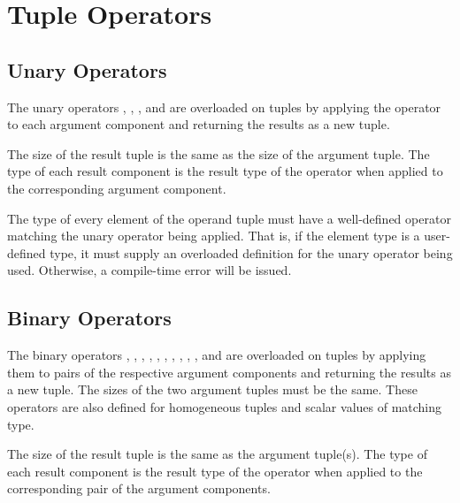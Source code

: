 \section{Tuple Operators}
\label{Tuple_Operators}

\subsection{Unary Operators}
\label{Tuple_Unary_Operators}

The unary operators \chpl{\+}, \chpl{\-}, \chpl{\~}, and \chpl{\!} are
overloaded on tuples by applying the operator to each argument component
and returning the results as a new tuple.

The size of the result tuple is the same as the size of the
argument tuple. The type of each result component is the result
type of the operator when applied to the corresponding argument component.

The type of every element of the operand tuple must have a
well-defined operator matching the unary operator being applied.  That
is, if the element type is a user-defined type, it must supply an
overloaded definition for the unary operator being used.  Otherwise, a
compile-time error will be issued.

\subsection{Binary Operators}
\label{Tuple_Binary_Operators}

The binary operators \chpl{\+}, \chpl{\-}, \chpl{\*}, \chpl{\/}, \chpl{\%},
\chpl{\*\*}, \chpl{\&}, \chpl{\|}, \chpl{\^}, \chpl{\<\<}, and \chpl{\>\>}
are overloaded on tuples by applying them to pairs of the respective
argument components and returning the results as a new tuple.  The
sizes of the two argument tuples must be the same.  These operators
are also defined for homogeneous tuples and scalar values of matching
type.

The size of the result tuple is the same as the argument tuple(s).
The type of each result component is the result type of the operator
when applied to the corresponding pair of the argument components.

